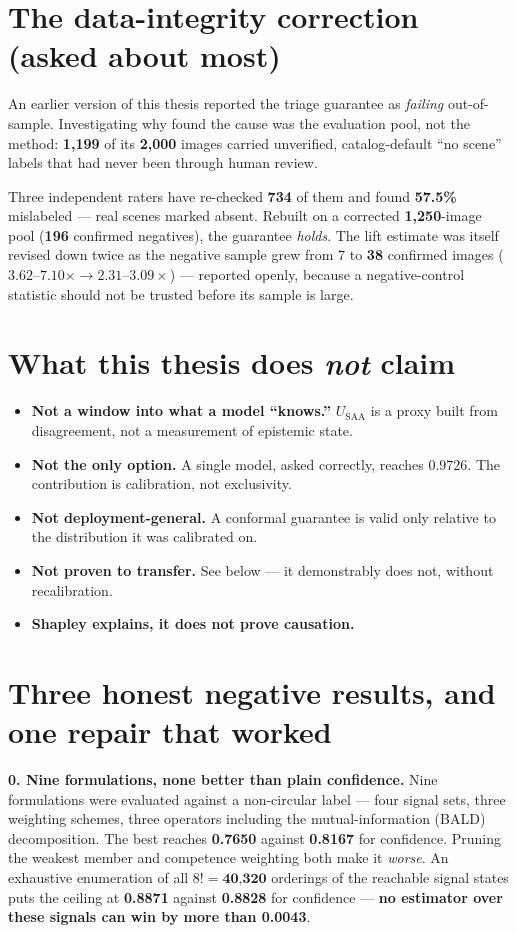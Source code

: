 \documentclass[10pt,a4paper]{article}
\newcommand{\num}[1]{\textbf{#1}}
\begin{document}
\section{The data-integrity correction (asked about most)}
An earlier version of this thesis reported the triage guarantee as \emph{failing} out-of-sample. Investigating why found the cause was the evaluation pool, not the method: \num{1{,}199} of its \num{2{,}000} images carried unverified, catalog-default ``no scene'' labels that had never been through human review.

Three independent raters have re-checked \num{734} of them and found \num{57.5\%} mislabeled --- real scenes marked absent. Rebuilt on a corrected \num{1{,}250}-image pool (\num{196} confirmed negatives), the guarantee \emph{holds}. The lift estimate was itself revised down twice as the negative sample grew from $7$ to \num{38} confirmed images ($3.62$--$7.10\times \rightarrow 2.31$--$3.09\times$) --- reported openly, because a negative-control statistic should not be trusted before its sample is large.

\section{What this thesis does \emph{not} claim}
\begin{itemize}
  \item \textbf{Not a window into what a model ``knows.''} $U_{\text{SAA}}$ is a proxy built from disagreement, not a measurement of epistemic state.
  \item \textbf{Not the only option.} A single model, asked correctly, reaches $0.9726$. The contribution is calibration, not exclusivity.
  \item \textbf{Not deployment-general.} A conformal guarantee is valid only relative to the distribution it was calibrated on.
  \item \textbf{Not proven to transfer.} See below --- it demonstrably does not, without recalibration.
  \item \textbf{Shapley explains, it does not prove causation.}
\end{itemize}

\section{Three honest negative results, and one repair that worked}
\textbf{0. Nine formulations, none better than plain confidence.} Nine formulations were evaluated against a non-circular label --- four signal sets, three weighting schemes, three operators including the mutual-information (BALD) decomposition. The best reaches \num{0.7650} against \num{0.8167} for confidence. Pruning the weakest member and competence weighting both make it \emph{worse}. An exhaustive enumeration of all $8!=\num{40{,}320}$ orderings of the reachable signal states puts the ceiling at \num{0.8871} against \num{0.8828} for confidence --- \textbf{no estimator over these signals can win by more than \num{0.0043}}.
\end{document}
